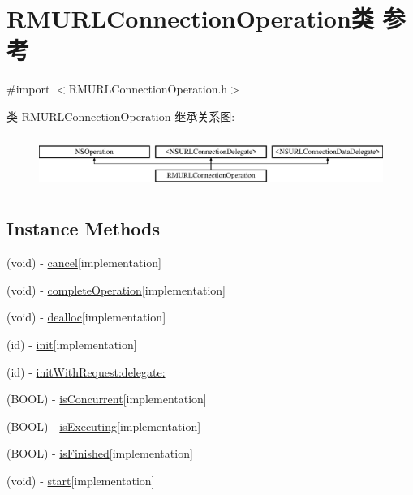\hypertarget{interface_r_m_u_r_l_connection_operation}{\section{R\-M\-U\-R\-L\-Connection\-Operation类 参考}
\label{interface_r_m_u_r_l_connection_operation}
}


{\ttfamily \#import $<$R\-M\-U\-R\-L\-Connection\-Operation.\-h$>$}

类 R\-M\-U\-R\-L\-Connection\-Operation 继承关系图\-:\begin{figure}[H]
\begin{center}
\leavevmode
\includegraphics[height=1.744548cm]{interface_r_m_u_r_l_connection_operation}
\end{center}
\end{figure}
\subsection*{Instance Methods}
\begin{DoxyCompactItemize}
\item 
(void) -\/ \hyperlink{interface_r_m_u_r_l_connection_operation_a99e246b97aa1ce926aeffb8527c28f45}{cancel}{\ttfamily  \mbox{[}implementation\mbox{]}}
\item 
(void) -\/ \hyperlink{interface_r_m_u_r_l_connection_operation_a7cbdc7875272c5788b349dadd929628f}{complete\-Operation}{\ttfamily  \mbox{[}implementation\mbox{]}}
\item 
(void) -\/ \hyperlink{interface_r_m_u_r_l_connection_operation_aad4772ff45f348cc0110fecc1bb99a07}{dealloc}{\ttfamily  \mbox{[}implementation\mbox{]}}
\item 
(id) -\/ \hyperlink{interface_r_m_u_r_l_connection_operation_a2bd62715f43a6a88daefa7a91ec1262e}{init}{\ttfamily  \mbox{[}implementation\mbox{]}}
\item 
(id) -\/ \hyperlink{interface_r_m_u_r_l_connection_operation_a6593c73d8cac84e1809f10bb09707a80}{init\-With\-Request\-:delegate\-:}
\item 
(B\-O\-O\-L) -\/ \hyperlink{interface_r_m_u_r_l_connection_operation_a853a42e287738292fa4c5ff3e0734c0e}{is\-Concurrent}{\ttfamily  \mbox{[}implementation\mbox{]}}
\item 
(B\-O\-O\-L) -\/ \hyperlink{interface_r_m_u_r_l_connection_operation_a88f95bcbf94aeccde612e66ee2174ac1}{is\-Executing}{\ttfamily  \mbox{[}implementation\mbox{]}}
\item 
(B\-O\-O\-L) -\/ \hyperlink{interface_r_m_u_r_l_connection_operation_a36a00992e494be65b6983c7604962fb4}{is\-Finished}{\ttfamily  \mbox{[}implementation\mbox{]}}
\item 
(void) -\/ \hyperlink{interface_r_m_u_r_l_connection_operation_ac8662842dc515fd766451ae8fbe821d8}{start}{\ttfamily  \mbox{[}implementation\mbox{]}}
\end{DoxyCompactItemize}
